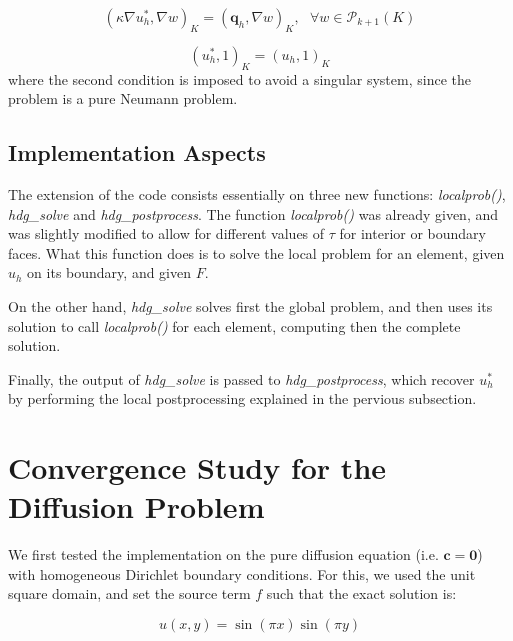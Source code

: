 \documentclass[10pt,a4paper]{article}
\begin{document}
\begin{equation}
	(\kappa \nabla u^*_h, \nabla w)_K = (\mathbf{q}_h,\nabla w)_K,~~~ \forall w \in \mathcal{P}_{k+1}(K)
\end{equation}

\begin{equation}
	(u^*_h,1)_K = (u_h,1)_K
\end{equation}
where the second condition is imposed to avoid a singular system, since the problem is a pure Neumann problem.

\subsection*{Implementation Aspects}

The extension of the code consists essentially on three new functions: \textit{localprob()}, \textit{hdg\_solve} and \textit{hdg\_postprocess}.
The function \textit{localprob()} was already given, and was slightly modified to allow for different values of $\tau$ for interior or boundary faces. What this function does is to solve the local problem
for an element, given $\hat{u}_h$ on its boundary, and given $F$.

On the other hand, \textit{hdg\_solve} solves first the global problem, and then uses its solution to call \textit{localprob()} for each element, computing then the complete solution.

Finally, the output of \textit{hdg\_solve} is passed to \textit{hdg\_postprocess}, which recover $u^*_h$ by performing the local postprocessing explained in the pervious subsection.
\section*{Convergence Study for the Diffusion Problem}
We first tested the implementation on the pure diffusion equation (i.e. $\mathbf{c} = \mathbf{0}$) with homogeneous Dirichlet boundary conditions. For this,
we used the unit square domain, and set the source term $f$ such that the exact solution is:

\begin{equation}
	u(x,y) = \sin(\pi x)\sin(\pi y)
\end{equation}
\end{document}
